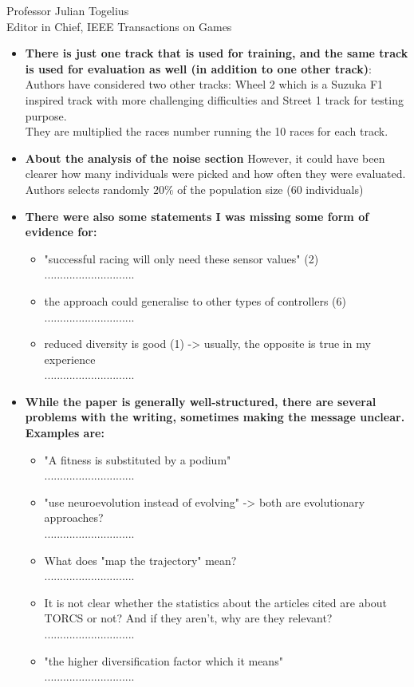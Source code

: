 \documentclass[10pt]{letter} %
\begin{document}
\begin{letter}{Professor Julian Togelius \\ Editor in Chief, IEEE Transactions on Games}
\begin{enumerate}
\begin{itemize}
.............................
		\item {\bf	There is just one track that is used for training, and the same track is used for evaluation as well (in addition to one other track)}:\\
		Authors have considered two other tracks: Wheel 2 which is a Suzuka F1 inspired track with more challenging difficulties and Street 1 track for testing purpose.\\
		They are multiplied the races number running the  10 races for each track.
		\item {\bf	About the analysis of the noise section} However, it could have been clearer how many individuals were picked and how often they were evaluated.\\
		Authors selects randomly $20\%$ of the population size (60 individuals)
	
		\item {\bf There were also some statements I was missing some form of evidence for:}
			\begin{itemize}
			\item	"successful racing will only need these sensor values" (2)\\
.............................
			\item	the approach could generalise to other types of controllers (6)\\
.............................
			\item	reduced diversity is good (1) -> usually, the opposite is true in my experience\\
.............................
			\end{itemize}

		\item {\bf 	While the paper is generally well-structured, there are several problems with the writing, sometimes making the message unclear. Examples are:}
			\begin{itemize}
			\item "A fitness is substituted by a podium"\\
.............................
			\item "use neuroevolution instead of evolving" -> both are evolutionary approaches?\\
.............................
			\item What does "map the trajectory" mean?\\
.............................
			\item It is not clear whether the statistics about the articles cited are about TORCS or not? And if they aren't, why are they relevant?\\
.............................
			\item "the higher diversification factor which it means"\\
.............................
			\end{itemize}
	


\end{itemize}
\end{enumerate}
\end{letter}
\end{document}
